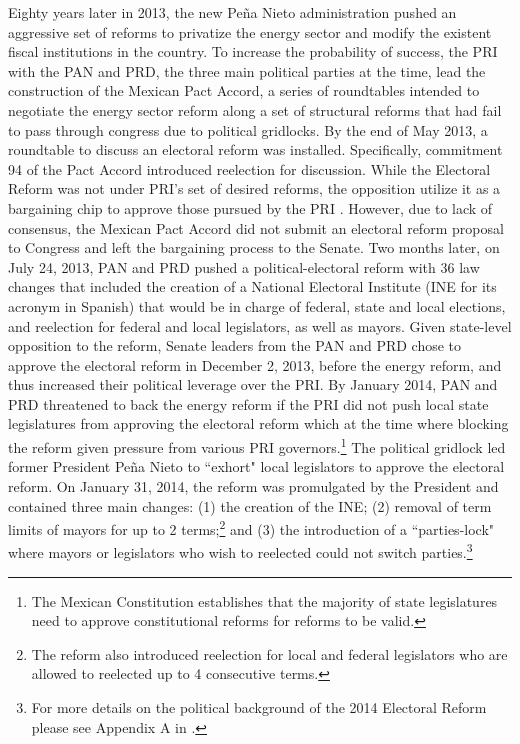 \documentclass[12pt]{amsart}
\numberwithin{equation}{section}
\theoremstyle{definition}
\theoremstyle{definition}
\theoremstyle{definition}
\begin{document}
Eighty years later in 2013, the new Peña Nieto administration pushed an aggressive set of reforms to privatize the energy sector and modify the existent fiscal institutions in the country. To increase the probability of success, the PRI with the PAN and PRD, the three main political parties at the time, lead the construction of the Mexican Pact Accord, a series of roundtables intended to negotiate the energy sector reform along a set of structural reforms that had fail to pass through congress due to political gridlocks. By the end of May 2013, a roundtable to discuss an electoral reform was installed. Specifically, commitment 94 of the Pact Accord introduced reelection for discussion. While the Electoral Reform was not under PRI's set of desired reforms, the opposition utilize it as a bargaining chip to approve those pursued by the PRI \citep{zamitiz_2017}. However, due to lack of consensus, the Mexican Pact Accord did not submit an electoral reform proposal to Congress and left the bargaining process to the Senate. Two months later, on July 24, 2013, PAN and PRD pushed a political-electoral reform with 36 law changes that included  the creation of a National Electoral Institute (INE for its acronym in Spanish) that would be in charge of federal, state and local elections, and reelection for federal and local legislators, as well as mayors. Given state-level opposition to the reform, Senate leaders from the PAN and PRD chose to approve the electoral reform in December 2, 2013, before the energy reform, and thus increased their political leverage over the PRI. By January 2014, PAN and PRD threatened to back the energy reform  if the PRI did not push local state legislatures from approving the electoral reform which at the time where blocking the reform given pressure from various PRI governors.\footnote{The Mexican Constitution establishes that the majority of state legislatures need to approve constitutional reforms for reforms to be valid.} The political gridlock led former President Peña Nieto to ``exhort" local legislators to approve the electoral reform. On January 31, 2014, the reform was promulgated by the President and contained three main changes: (1) the creation of the INE; (2) removal of term limits of mayors for up to 2 terms;\footnote{The reform also introduced reelection for local and federal legislators who are allowed to reelected up to 4 consecutive terms.} and (3) the introduction of a ``parties-lock"	where mayors or legislators who wish to reelected could not switch parties.\footnote{For more details on the political background of the 2014 Electoral Reform please see Appendix A in \citet{ch_2021}.}
\end{document}
